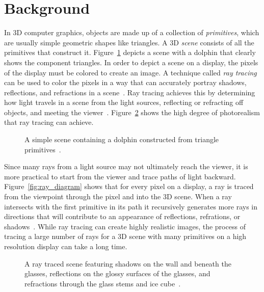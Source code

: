 \documentclass{sig-alternate}
\begin{document}
\section{Background}
\label{sec:background}

In 3D computer graphics, objects are made up of a collection of \emph{primitives}, which are usually simple geometric shapes like triangles. A 3D \emph{scene} consists of all the primitives that construct it. Figure~\ref{fig:dolphin} depicts a scene with a dolphin that clearly shows the component triangles. In order to depict a scene on a display, the pixels of the display must be colored to create an image. A technique called \emph{ray tracing} can be used to color the pixels in a way that can accurately portray shadows, reflections, and refractions in a scene~\cite{Viitanen:2015}. Ray tracing achieves this by determining how light travels in a scene from the light sources, reflecting or refracting off objects, and meeting the viewer~\cite{Whitted:1980}. Figure~\ref{fig:glasses} shows the high degree of photorealism that ray tracing can achieve.

\begin{figure}
\centering
{}
\caption{A simple scene containing a dolphin constructed from triangle primitives~\cite{wiki:mesh}.}
\label{fig:dolphin}
\end{figure}

Since many rays from a light source may not ultimately reach the viewer, it is more practical to start from the viewer and trace paths of light backward. Figure~\ref{fig:ray_diagram} shows that for every pixel on a display, a ray is traced from the viewpoint through the pixel and into the 3D scene. When a ray intersects with the first primitive in its path it recursively generates more rays in directions that will contribute to an appearance of reflections, refrations, or shadows~\cite{Whitted:1980}. While ray tracing can create highly realistic images, the process of tracing a large number of rays for a 3D scene with many primitives on a high resolution display can take a long time.

\begin{figure}[t]
\centering
{}
\caption{A ray traced scene featuring shadows on the wall and beneath the glasses, reflections on the glossy surfaces of the glasses, and refractions through the glass stems and ice cube~\cite{wiki:rayTracing}.}
\label{fig:glasses}
\end{figure}
\end{document}
